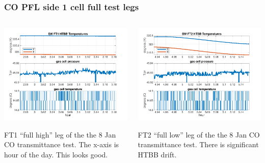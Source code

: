\documentclass[10pt]{beamer}
\begin{document}
\begin{frame}
\frametitle{CO PFL side 1 cell full test legs}
\begin{columns}[t]
\begin{column}{0.5\textwidth}
  \begin{centering}
  \includegraphics[width=\textwidth]{harvest_01-07/01-08_SW_FT1.png}
  \end{centering}\vspace{3mm}

  FT1 ``full high'' leg of the the 8 Jan CO transmittance test.
  The x-axis is hour of the day.  This looks good.

\end{column}
\begin{column}{0.5\textwidth}  
  \begin{centering}
  \includegraphics[width=\textwidth]{harvest_01-07/01-08_SW_FT2.png}
  \end{centering}\vspace{3mm}

  FT2 ``full low'' leg of the the 8 Jan CO transmittance test.
  There is significant HTBB drift.

\end{column}
\end{columns}
\end{frame}
\end{document}
